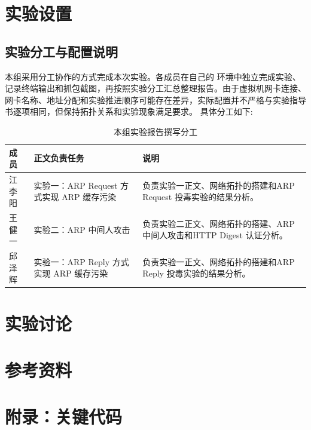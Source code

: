 \documentclass{lab1report}
\begin{document}
\makecover




\section{实验设置}

\subsection{实验分工与配置说明}

本组采用分工协作的方式完成本次实验。各成员在自己的 环境中独立完成实验、记录终端输出和抓包截图，再按照实验分工汇总整理报告。由于虚拟机网卡连接、网卡名称、地址分配和实验推进顺序可能存在差异，实际配置并不严格与实验指导书逐项相同，但保持拓扑关系和实验现象满足要求。
具体分工如下:
\begin{table}[H]
    \centering
    \caption{本组实验报告撰写分工}
    \label{tab:group-division}
    \renewcommand{\arraystretch}{1.35}
    \begin{tabularx}{\linewidth}{>{\raggedright\arraybackslash}p{3.0cm} >{\raggedright\arraybackslash}p{3.2cm} X}
        \toprule
        成员 & 正文负责任务 & 说明 \\
        \midrule
        江李阳 & 实验一：ARP Request 方式实现 ARP 缓存污染 & 负责实验一正文、网络拓扑的搭建和ARP Request 投毒实验的结果分析。 \\
        王健一 & 实验二：ARP 中间人攻击 & 负责实验二正文、网络拓扑的搭建、ARP 中间人攻击和HTTP Digest 认证分析。 \\
        邱泽辉 & 实验一：ARP Reply 方式实现 ARP 缓存污染 & 负责实验一正文、网络拓扑的搭建和ARP Reply 投毒实验的结果分析。 \\
        \bottomrule
    \end{tabularx}
\end{table}






\section{实验讨论}


\section{参考资料}
\nocite{labguide,rfc7616,scapy,wireshark}
\printbibliography[heading=none]

\newpage
\appendix
\section{附录：关键代码}

\end{document}
